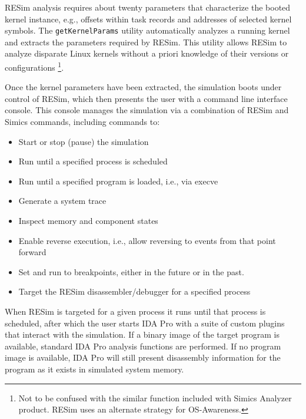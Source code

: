 \documentclass[titlepage]{article}
\begin{document}
RESim analysis requires about twenty parameters that characterize the booted kernel instance, e.g., offsets within task records and addresses of selected kernel symbols.  The {\tt getKernelParams} utility automatically analyzes a running kernel and extracts the parameters required by RESim.  
This utility allows RESim to analyze disparate Linux kernels without a priori knowledge of their versions or configurations \footnote{Not to be confused with the similar function included with Simics Analyzer product. RESim uses an alternate strategy for OS-Awareness.}.

Once the kernel parameters have been extracted, the simulation boots under control of RESim, which then presents the user with a command line interface console.  This console manages the simulation via a combination of RESim and Simics commands, including commands to:
\begin{itemize}
\item Start or stop (pause) the simulation
\item Run until a specified process is scheduled
\item Run until a specified program is loaded, i.e., via execve
\item Generate a system trace
\item Inspect memory and component states
\item Enable reverse execution, i.e., allow reversing to events from that point forward
\item Set and run to breakpoints, either in the future or in the past.
\item Target the RESim disassembler/debugger for a specified process
\end{itemize}

When RESim is targeted for a given process it runs until that process is scheduled, after which the user starts IDA Pro with a suite of custom plugins that interact with the simulation.  If a binary image of the target program is available, standard IDA Pro analysis functions are performed.  If no program image is available, IDA Pro will still present disassembly information for the program as it exists in simulated system memory.  
\end{document}
